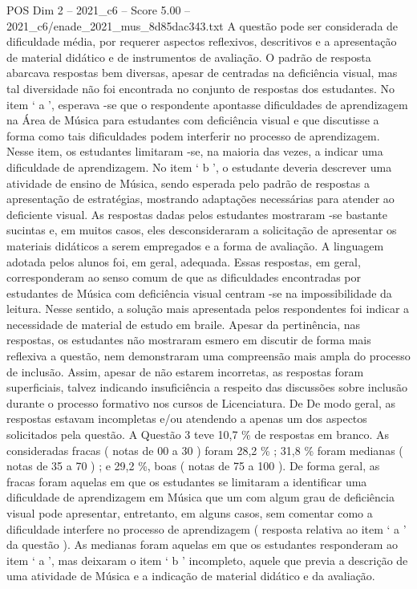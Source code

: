 \begin{textsample}{POS Dim 2 – 2021\_c6 – Score 5.00 – 2021\_c6/enade\_2021\_mus\_8d85dac343.txt}
A questão pode ser considerada de dificuldade média, por requerer aspectos reflexivos, descritivos e a apresentação de material didático e de instrumentos de avaliação.
O padrão de resposta abarcava respostas bem diversas, apesar de centradas na deficiência visual, mas tal diversidade não foi encontrada no conjunto de respostas dos estudantes.
No item ‘ a ’, esperava -se que o respondente apontasse dificuldades de aprendizagem na Área de Música para estudantes com deficiência visual e que discutisse a forma como tais dificuldades podem interferir no processo de aprendizagem.
Nesse item, os estudantes limitaram -se, na maioria das vezes, a indicar uma dificuldade de aprendizagem.
No item ‘ b ’, o estudante deveria descrever uma atividade de ensino de Música, sendo esperada pelo padrão de respostas a apresentação de estratégias, mostrando adaptações necessárias para atender ao deficiente visual.
As respostas dadas pelos estudantes mostraram -se bastante sucintas e, em muitos casos, eles desconsideraram a solicitação de apresentar os materiais didáticos a serem empregados e a forma de avaliação.
A linguagem adotada pelos alunos foi, em geral, adequada.
Essas respostas, em geral, corresponderam ao senso comum de que as dificuldades encontradas por estudantes de Música com deficiência visual centram -se na impossibilidade da leitura.
Nesse sentido, a solução mais apresentada pelos respondentes foi indicar a necessidade de material de estudo em braile.
Apesar da pertinência, nas respostas, os estudantes não mostraram esmero em discutir de forma mais reflexiva a questão, nem demonstraram uma compreensão mais ampla do processo de inclusão.
Assim, apesar de não estarem incorretas, as respostas foram superficiais, talvez indicando insuficiência a respeito das discussões sobre inclusão durante o processo formativo nos cursos de Licenciatura.
De De modo geral, as respostas estavam incompletas e/ou atendendo a apenas um dos aspectos solicitados pela questão.
A Questão 3 teve 10,7 \% de respostas em branco.
As consideradas fracas ( notas de 00 a 30 ) foram 28,2 \% ; 31,8 \% foram medianas ( notas de 35 a 70 ) ; e 29,2 \%, boas ( notas de 75 a 100 ).
De forma geral, as fracas foram aquelas em que os estudantes se limitaram a identificar uma dificuldade de aprendizagem em Música que um com algum grau de deficiência visual pode apresentar, entretanto, em alguns casos, sem comentar como a dificuldade interfere no processo de aprendizagem ( resposta relativa ao item ‘ a ’ da questão ).
As medianas foram aquelas em que os estudantes responderam ao item ‘ a ’, mas deixaram o item ‘ b ’ incompleto, aquele que previa a descrição de uma atividade de Música e a indicação de material didático e da avaliação.

\end{textsample}
